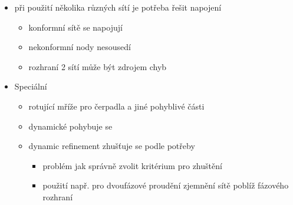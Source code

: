 \documentclass[letterpaper,10pt,czech]{sphinxmanual}
\begin{document}
\begin{itemize}
\item {} 
\sphinxAtStartPar
při použití několika různých sítí je potřeba řešit napojení
\begin{itemize}
\item {} 
\sphinxAtStartPar
konformní \sphinxhyphen{} sítě se napojují

\item {} 
\sphinxAtStartPar
nekonformní \sphinxhyphen{} nody nesousedí

\item {} 
\sphinxAtStartPar
rozhraní 2 sítí může být zdrojem chyb

\end{itemize}

\item {} 
\sphinxAtStartPar
Speciální
\begin{itemize}
\item {} 
\sphinxAtStartPar
rotující mříže \textendash{} pro čerpadla a jiné pohyblivé části

\item {} 
\sphinxAtStartPar
dynamické \textendash{} pohybuje se

\item {} 
\sphinxAtStartPar
dynamic refinement \textendash{} zhušťuje se podle potřeby
\begin{itemize}
\item {} 
\sphinxAtStartPar
problém \textendash{} jak správně zvolit kritérium pro zhuštění

\item {} 
\sphinxAtStartPar
použití např. pro dvoufázové proudění \textendash{} zjemnění sítě poblíž fázového rozhraní

\end{itemize}

\end{itemize}

\end{itemize}
\end{document}
